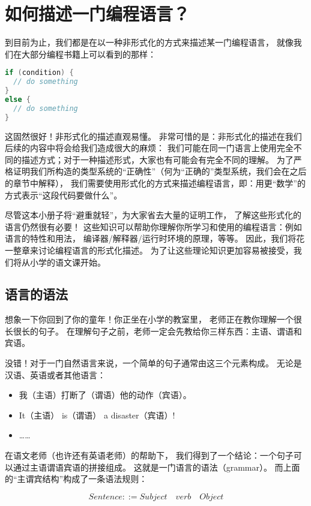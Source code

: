 \documentclass[../main.tex]{subfiles}
\begin{document}
  \section{如何描述一门编程语言？}
  \indent 到目前为止，我们都是在以一种非形式化的方式来描述某一门编程语言，
  就像我们在大部分编程书籍上可以看到的那样：

\begin{lstlisting}[language=c]
if (condition) {
  // do something
}
else {
  // do something
}
\end{lstlisting}

  \indent 这固然很好！非形式化的描述直观易懂。
  非常可惜的是：非形式化的描述在我们后续的内容中将会给我们造成很大的麻烦：
  我们可能在同一门语言上使用完全不同的描述方式；对于一种描述形式，大家也有可能会有完全不同的理解。
  为了严格证明我们所构造的类型系统的“正确性”（何为“正确的”类型系统，我们会在之后的章节中解释），
  我们需要使用形式化的方式来描述编程语言，即：用更“数学”的方式表示“这段代码要做什么”。

  \indent 尽管这本小册子将“避重就轻”，为大家省去大量的证明工作，
  了解这些形式化的语言仍然很有必要！
  这些知识可以帮助你理解你所学习和使用的编程语言：例如语言的特性和用法，
  编译器/解释器/运行时环境的原理，等等。\cite{edu}
  因此，我们将花一整章来讨论编程语言的形式化描述。
  为了让这些理论知识更加容易被接受，我们将从小学的语文课开始。

  \subsection{语言的语法}
  \indent 想象一下你回到了你的童年！你正坐在小学的教室里，
  老师正在教你理解一个很长很长的句子。
  在理解句子之前，老师一定会先教给你三样东西：主语、谓语和宾语。
  
  \indent 没错！对于一门自然语言来说，一个简单的句子通常由这三个元素构成。
  无论是汉语、英语或者其他语言：

  \begin{itemize}
    \item 我（主语）打断了（谓语）他的动作（宾语）。
    \item It（主语） is（谓语） a disaster（宾语）!
    \item ……
  \end{itemize}

  \indent 在语文老师（也许还有英语老师）的帮助下，
  我们得到了一个结论：一个句子可以通过主语谓语宾语的拼接组成。
  这就是一门语言的语法（grammar）。
  而上面的“主谓宾结构”构成了一条语法规则：

  $$Sentence ::= Subject\quad verb\quad Object$$
\end{document}
